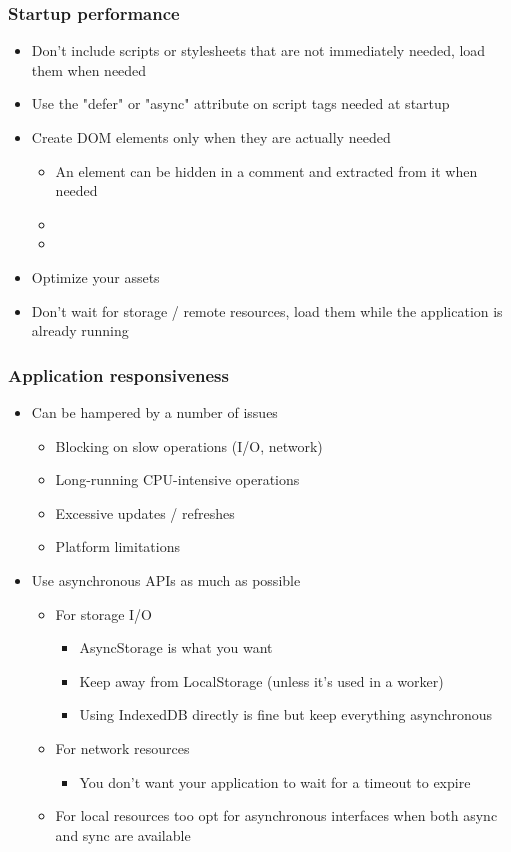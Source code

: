 \begin{frame}
 \frametitle{Startup performance}
 \begin{itemize}
  \item Don't include scripts or stylesheets that are not immediately needed, load them when needed
  \item Use the "defer" or "async" attribute on script tags needed at startup
  \item Create DOM elements only when they are actually needed
   \begin{itemize}
    \item An element can be hidden in a comment and extracted from it when needed
    \item {}
    \item {}
   \end{itemize}
  \item Optimize your assets
  \item Don't wait for storage / remote resources, load them while the application is already running
 \end{itemize}
\end{frame}

\begin{frame}
 \frametitle{Application responsiveness}
 \begin{itemize}
  \item Can be hampered by a number of issues
  \begin{itemize}
   \item Blocking on slow operations (I/O, network)
   \item Long-running CPU-intensive operations
   \item Excessive updates / refreshes
   \item Platform limitations
  \end{itemize}
  \item Use asynchronous APIs as much as possible
   \begin{itemize}
    \item For storage I/O
     \begin{itemize}
      \item AsyncStorage is what you want
      \item Keep away from LocalStorage (unless it's used in a worker)
      \item Using IndexedDB directly is fine but keep everything asynchronous
     \end{itemize}
    \item For network resources
    \begin{itemize}
     \item You don't want your application to wait for a timeout to expire
    \end{itemize}
    \item For local resources too opt for asynchronous interfaces when both async and sync are available
   \end{itemize}
 \end{itemize}
\end{frame}

